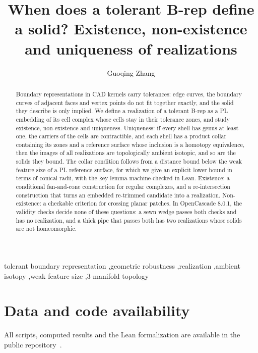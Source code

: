 \documentclass[preprint,12pt]{elsarticle}
\theoremstyle{definition}
\theoremstyle{remark}
\begin{document}
\begin{frontmatter}

\title{When does a tolerant B-rep define a solid? Existence, non-existence and uniqueness of realizations}

\author{Guoqing Zhang}
\address{ZENFLUX, Miami Gardens, Florida, USA}

\begin{abstract}
Boundary representations in CAD kernels carry tolerances: edge curves, the boundary curves of adjacent faces and vertex
points do not fit together exactly, and the solid they describe is only implied. We define a realization of a tolerant
B-rep as a PL embedding of its cell complex whose cells stay in their tolerance zones, and study existence,
non-existence and uniqueness. Uniqueness: if every shell has genus at least one, the carriers of the cells are
contractible, and each shell has a product collar containing its zones and a reference surface whose inclusion is a
homotopy equivalence, then the images of all realizations are topologically ambient isotopic, and so are the solids
they bound. The collar condition follows from a distance bound below the weak feature size of a PL reference surface,
for which we give an explicit lower bound in terms of conical radii, with the key lemma machine-checked in Lean.
Existence: a conditional fan-and-cone construction for regular complexes, and a re-intersection construction that
turns an embedded re-trimmed candidate into a realization. Non-existence: a checkable criterion for crossing planar
patches. In OpenCascade 8.0.1, the validity checks decide none of these questions: a sewn wedge passes both checks and
has no realization, and a thick pipe that passes both has two realizations whose solids are not homeomorphic.
\end{abstract}

\begin{keyword}
tolerant boundary representation \sep geometric robustness \sep realization \sep ambient isotopy \sep weak feature
size \sep 3-manifold topology
\end{keyword}

\end{frontmatter}










\section*{Data and code availability}
All scripts, computed results and the Lean formalization are available in the public repository~\cite{repo}.
\end{document}

